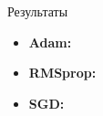 \documentclass[aspectratio=169]{beamer}
\begin{document}
\begin{frame}{Результаты}
    
            \begin{itemize}
                \item \textbf{Adam:}   
                \item \textbf{RMSprop:} 
                \item \textbf{SGD:}        
            \end{itemize}
            
          
           
\end{frame}
\end{document}
